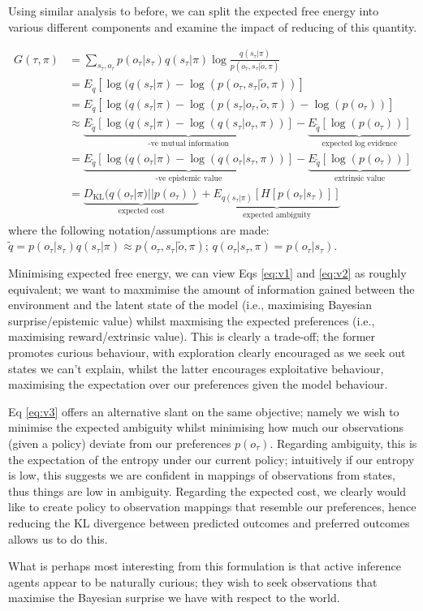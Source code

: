 \documentclass{article}
\newcommand{\KL}{\text{KL}}
\begin{document}
Using similar analysis to before, we can split the expected free energy into various different components and examine the impact of reducing of this quantity.

\begin{align}
    G(\tau,\pi) &= \sum_{s_\tau,o_\tau} p(o_\tau|s_\tau)  q(s_\tau|\pi) \log \frac{q(s_\tau|\pi)}{p(o_\tau,s_\tau|\tilde{o},\pi)}\\
            &= E_{\tilde{q}} \left[\log(q(s_\tau|\pi) - \log(p(o_\tau,s_\tau|\tilde{o},\pi))\right]\\
            &= E_{\tilde{q}} \left[\log(q(s_\tau|\pi) - \log(p(s_\tau|o_\tau,\tilde{o},\pi)) - \log(p(o_\tau))\right]\\
            &\approx \underbrace{E_{\tilde{q}} \left[ \log(q(s_\tau|\pi) - \log(q(s_\tau|o_\tau,\pi))\right]}_{\text{-ve mutual information}}  - \underbrace{E_{\tilde{q}}\left[\log(p(o_\tau)) \right]}_{\text{expected log evidence}}\label{eq:v1}\\
            &= \underbrace{E_{\tilde{q}} \left[ \log(q(o_\tau|\pi) - \log(q(o_\tau|s_\tau,\pi))\right]}_\text{-ve epistemic value}  - \underbrace{E_{\tilde{q}}\left[\log(p(o_\tau)) \right]}_\text{extrinsic value}\label{eq:v2}\\
            &= \underbrace{D_\KL(q(o_\tau|\pi)||p(o_\tau))}_\text{expected cost}+
            \underbrace{E_{q(s_\tau|\pi)}\left[H[p(o_\tau|s_\tau)] \right]}_\text{expected ambiguity}\label{eq:v3}
\end{align}
where the following notation/assumptions are made: $\tilde{q} = p(o_\tau|s_\tau)q(s_\tau|\pi) \approx p(o_\tau,s_\tau|\tilde{o},\pi)$; $q(o_\tau|s_\tau,\pi)=p(o_\tau|s_\tau)$.

Minimising expected free energy, we can view Eqs \ref{eq:v1} and \ref{eq:v2} as roughly equivalent; we want to maxmimise the amount of information gained between the environment and the latent state of the model (i.e., maximising Bayesian surprise/epistemic value) whilst maxmising the expected preferences (i.e., maximising reward/extrinsic value). This is clearly a trade-off; the former promotes curious behaviour, with exploration clearly encouraged as we seek out states we can't explain, whilst the latter encourages exploitative behaviour, maximising the expectation over our preferences given the model behaviour.

Eq \ref{eq:v3} offers an alternative slant on the same objective; namely we wish to minimise the expected ambiguity whilst minimising how much our observations (given a policy) deviate from our preferences $p(o_\tau)$. Regarding ambiguity, this is the expectation of the entropy under our current policy; intuitively if our entropy is low, this suggests we are confident in mappings of observations from states, thus things are low in ambiguity. Regarding the expected cost, we clearly would like to create policy to observation mappings that resemble our preferences, hence reducing the KL divergence between predicted outcomes and preferred outcomes allows us to do this.

What is perhaps most interesting from this formulation is that active inference agents appear to be naturally curious; they wish to seek observations that maximise the Bayesian surprise we have with respect to the world.
\end{document}
